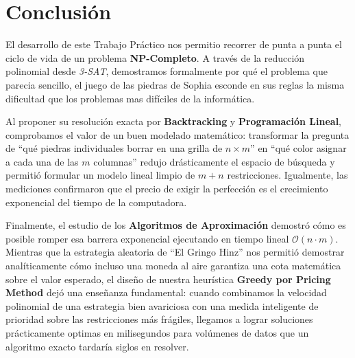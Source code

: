 \section{Conclusión}

El desarrollo de este Trabajo Práctico nos permitio recorrer de punta a punta el ciclo de vida de un problema \textbf{NP-Completo}. A través de la reducción polinomial desde \textit{3-SAT}, demostramos formalmente por qué el problema que parecia sencillo, el juego de las piedras de Sophia esconde en sus reglas la misma dificultad que los problemas mas difíciles de la informática.

Al proponer su resolución exacta por \textbf{Backtracking} y \textbf{Programación Lineal}, comprobamos el valor de un buen modelado matemático: transformar la pregunta de ``qué piedras individuales borrar en una grilla de $n \times m$'' en ``qué color asignar a cada una de las $m$ columnas'' redujo drásticamente el espacio de búsqueda y permitió formular un modelo lineal limpio de $m + n$ restricciones. Igualmente, las mediciones confirmaron que el precio de exigir la perfección es el crecimiento exponencial del tiempo de la computadora.

Finalmente, el estudio de los \textbf{Algoritmos de Aproximación} demostró cómo es posible romper esa barrera exponencial ejecutando en tiempo lineal $\mathcal{O}(n \cdot m)$. Mientras que la estrategia aleatoria de ``El Gringo Hinz'' nos permitió demostrar analíticamente cómo incluso una moneda al aire garantiza una cota matemática sobre el valor esperado, el diseño de nuestra heurística \textbf{Greedy por Pricing Method} dejó una enseñanza fundamental: cuando combinamos la velocidad polinomial de una estrategia bien avariciosa con una medida inteligente de prioridad sobre las restricciones más frágiles, llegamos a lograr soluciones prácticamente optimas en milisegundos para volúmenes de datos que un algoritmo exacto tardaría siglos en resolver.

